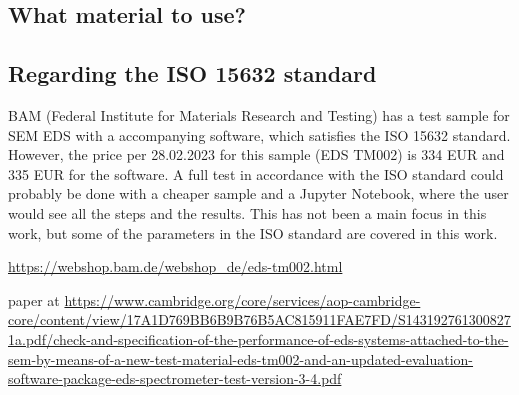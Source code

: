 \subsection{What material to use?}















\subsection{Regarding the ISO 15632 standard}
\label{theory:detector_status:iso15632}

BAM (Federal Institute for Materials Research and Testing) has a test sample for SEM EDS with a accompanying software, which satisfies the ISO 15632 standard.
However, the price per 28.02.2023 for this sample (EDS TM002) is 334 EUR and 335 EUR for the software.
A full test in accordance with the ISO standard could probably be done with a cheaper sample and a Jupyter Notebook, where the user would see all the steps and the results.
This has not been a main focus in this work, but some of the parameters in the ISO standard are covered in this work.

\url{https://webshop.bam.de/webshop_de/eds-tm002.html}

paper at \url{https://www.cambridge.org/core/services/aop-cambridge-core/content/view/17A1D769BB6B9B76B5AC815911FAE7FD/S1431927613008271a.pdf/check-and-specification-of-the-performance-of-eds-systems-attached-to-the-sem-by-means-of-a-new-test-material-eds-tm002-and-an-updated-evaluation-software-package-eds-spectrometer-test-version-3-4.pdf}



















